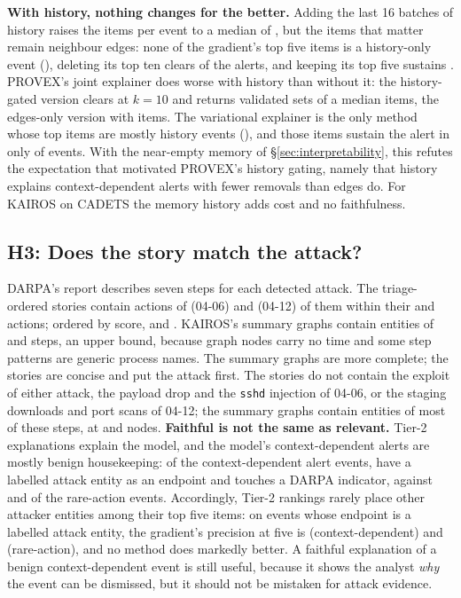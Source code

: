 \documentclass[conference]{IEEEtran}
\begin{document}
\textbf{With history, nothing changes for the better.} Adding the last 16 batches of history raises the
items per event to a median of \HBWinItems{}, but the items that matter remain neighbour edges: none of the
gradient's top five items is a history-only event (\HBWinGradientHistFive{}), deleting its top ten clears
\HBWinGradientFlipTen{} of the \HBWinN{} alerts, and keeping its top five sustains \HBWinGradientKeepFive{}.
PROVEX's joint explainer does worse with history than without it: the history-gated version clears
\HBWinJointFlipTen{} at $k{=}10$ and returns validated sets of a median \HBWinJointOwnSize{} items, the
edges-only version \HBWinJointEdgesFlipTen{} with \HBWinJointEdgesOwnSize{} items. The variational
explainer is the only method whose top items are mostly history events (\HBWinVariationalHistFive{}), and
those items sustain the alert in only \HBWinVariationalKeepFive{} of events. With the near-empty memory of
\S\ref{sec:interpretability}, this refutes the expectation that motivated PROVEX's history gating, namely
that history explains context-dependent alerts with fewer removals than edges do. For KAIROS on CADETS the
memory history adds cost and no faithfulness.


\subsection{H3: Does the story match the attack?}
DARPA's report describes seven steps for each detected attack. The triage-ordered stories contain
actions of \StoryStepsSix{} (04-06) and \StoryStepsTwelve{} (04-12) of them within their
\StoryItemsSix{} and \StoryItemsTwelve{} actions; ordered by score, \StoryScoreStepsSix{} and
\StoryScoreStepsTwelve{}. KAIROS's summary graphs contain entities of \SummaryStepsSix{} and
\SummaryStepsTwelve{} steps, an upper bound, because graph nodes carry no time and some step patterns are
generic process names. The summary graphs are more complete; the stories are concise and put the attack
first. The stories do not contain the exploit of either attack, the payload drop and the \texttt{sshd}
injection of 04-06, or the staging downloads and port scans of 04-12; the summary graphs contain
entities of most of these steps, at \SummaryNodesSix{} and \SummaryNodesTwelve{} nodes.
\textbf{Faithful is not the same as relevant.} Tier-2 explanations explain the model, and the model's
context-dependent alerts are mostly benign housekeeping: of the \NumWindowEvents{} context-dependent alert
events, \NumWindowGTEndpoint{} have a labelled attack entity as an endpoint and \NumWindowDarpa{} touches a
DARPA indicator, against \NumPriorGTEndpoint{} and \NumPriorDarpa{} of the \NumPriorEvents{} rare-action
events. Accordingly, Tier-2 rankings rarely place other attacker entities among their top five items:
on events whose endpoint is a labelled attack entity, the gradient's precision at five is
\HAWinGradientGtPFive{} (context-dependent) and \HAPriorGradientGtPFive{} (rare-action), and no method
does markedly better. A faithful explanation of a benign context-dependent event is still useful, because it
shows the analyst \emph{why} the event can be dismissed, but it should not be mistaken for attack evidence.
\end{document}
